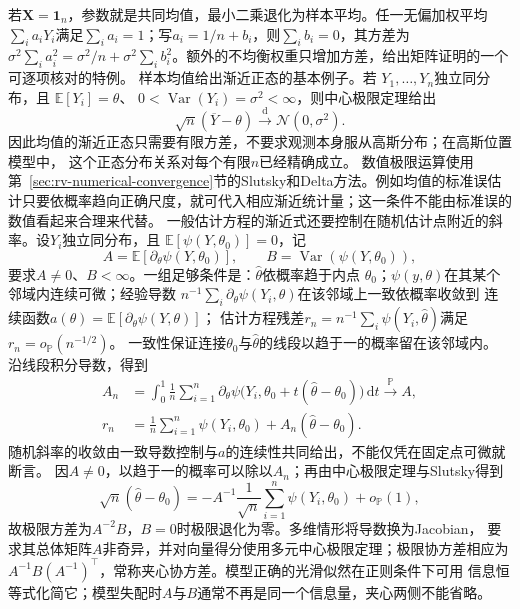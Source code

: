 若\(\bm X=\bm1_n\)，参数就是共同均值，最小二乘退化为样本平均。任一无偏加权平均\(\sum_i a_iY_i\)满足\(\sum_i a_i=1\)；写\(a_i=1/n+b_i\)，则\(\sum_i b_i=0\)，其方差为
\(\sigma^2\sum_i a_i^2=\sigma^2/n+\sigma^2\sum_i b_i^2\)。额外的不均衡权重只增加方差，给出矩阵证明的一个可逐项核对的特例。
样本均值给出渐近正态的基本例子。若
\(Y_1,\ldots,Y_n\)独立同分布，且
\(\mathbb{E}[Y_i]=\theta\)、
\(0<\operatorname{Var}(Y_i)=\sigma^2<\infty\)，则中心极限定理给出
\[
  \sqrt n(\overline Y-\theta)
  \xrightarrow{\mathrm d}\mathcal N(0,\sigma^2).
\]
因此均值的渐近正态只需要有限方差，不要求观测本身服从高斯分布；在高斯位置模型中，
这个正态分布关系对每个有限\(n\)已经精确成立。
数值极限运算使用第~\ref{sec:rv-numerical-convergence}节的Slutsky和Delta方法。例如均值的标准误估计只要依概率趋向正确尺度，就可代入相应渐近统计量；这一条件不能由标准误的数值看起来合理来代替。
一般估计方程的渐近式还要控制在随机估计点附近的斜率。设\(Y_i\)独立同分布，且
\(\mathbb{E}[\psi(Y,\theta_0)]=0\)，记
\[
  A=\mathbb{E}[\partial_\theta\psi(Y,\theta_0)],
  \qquad B=\operatorname{Var}(\psi(Y,\theta_0)),
\]
要求\(A\neq0\)、\(B<\infty\)。一组足够条件是：\(\widehat\theta\)依概率趋于内点
\(\theta_0\)；\(\psi(y,\theta)\)在其某个邻域内连续可微；经验导数
\(n^{-1}\sum_i\partial_\theta\psi(Y_i,\theta)\)在该邻域上一致依概率收敛到
连续函数\(a(\theta)=\mathbb E[\partial_\theta\psi(Y,\theta)]\)；
估计方程残差\(r_n=n^{-1}\sum_i\psi(Y_i,\widehat\theta)\)满足
\(r_n=o_{\mathbb P}(n^{-1/2})\)。
一致性保证连接\(\theta_0\)与\(\widehat\theta\)的线段以趋于一的概率留在该邻域内。
沿线段积分导数，得到
\[
\begin{aligned}
 A_n&=\int_0^1\frac1n\sum_{i=1}^n
  \partial_\theta\psi\bigl(Y_i,\theta_0+t(\widehat\theta-\theta_0)\bigr)\,\mathrm dt
  \xrightarrow{\mathbb P}A,\\
 r_n&=\frac1n\sum_{i=1}^n\psi(Y_i,\theta_0)+A_n(\widehat\theta-\theta_0).
\end{aligned}
\]
随机斜率的收敛由一致导数控制与\(a\)的连续性共同给出，不能仅凭在固定点可微就断言。
因\(A\neq0\)，以趋于一的概率可以除以\(A_n\)；再由中心极限定理与Slutsky得到
\[
  \sqrt n(\widehat\theta-\theta_0)
  =
  -A^{-1}\frac1{\sqrt n}\sum_{i=1}^n\psi(Y_i,\theta_0)
  +o_{\mathbb{P}}(1),
\]
故极限方差为\(A^{-2}B\)，\(B=0\)时极限退化为零。多维情形将导数换为Jacobian，
要求其总体矩阵\(A\)非奇异，并对向量得分使用多元中心极限定理；极限协方差相应为
\(A^{-1}B(A^{-1})^\top\)，常称夹心协方差。模型正确的光滑似然在正则条件下可用
信息恒等式化简它；模型失配时\(A\)与\(B\)通常不再是同一个信息量，夹心两侧不能省略。

